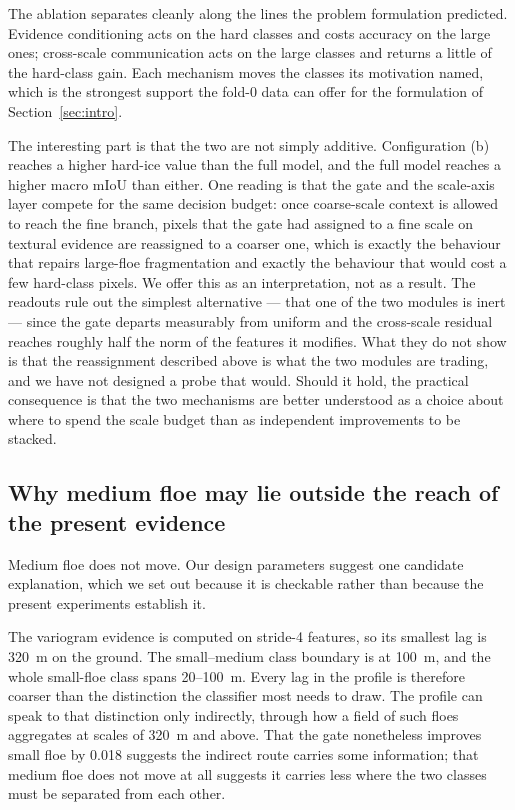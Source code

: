 \documentclass[preprint,12pt,authoryear]{elsarticle}
\begin{document}
The ablation separates cleanly along the lines the problem formulation
predicted. Evidence conditioning acts on the hard classes and costs accuracy on
the large ones; cross-scale communication acts on the large classes and returns
a little of the hard-class gain. Each mechanism moves the classes its motivation
named, which is the strongest support the fold-0 data can offer for the
formulation of Section~\ref{sec:intro}.

The interesting part is that the two are not simply additive. Configuration (b)
reaches a higher hard-ice value than the full model, and the full model reaches
a higher macro mIoU than either. One reading is that the gate and the scale-axis
layer compete for the same decision budget: once coarse-scale context is allowed
to reach the fine branch, pixels that the gate had assigned to a fine scale on
textural evidence are reassigned to a coarser one, which is exactly the
behaviour that repairs large-floe fragmentation and exactly the behaviour that
would cost a few hard-class pixels. We offer this as an interpretation, not as a
result. The readouts rule out the simplest alternative --- that one of the two
modules is inert --- since the gate departs measurably from uniform and the
cross-scale residual reaches roughly half the norm of the features it modifies.
What they do not show is that the reassignment described above is what the two
modules are trading, and we have not designed a probe that would. Should it hold, the practical
consequence is that the two mechanisms are better understood as a choice about
where to spend the scale budget than as independent improvements to be stacked.

\subsection{Why medium floe may lie outside the reach of the present evidence}

Medium floe does not move. Our design parameters suggest one candidate
explanation, which we set out because it is checkable rather than because the
present experiments establish it.

The variogram evidence is computed on stride-4 features, so its smallest lag is
320~m on the ground. The small--medium class boundary is at 100~m, and the whole
small-floe class spans 20--100~m. Every lag in the profile is therefore coarser
than the distinction the classifier most needs to draw. The profile can speak to
that distinction only indirectly, through how a field of such floes aggregates
at scales of 320~m and above. That the gate nonetheless improves small floe by
0.018 suggests the indirect route carries some information; that medium floe
does not move at all suggests it carries less where the two classes must be
separated from each other.
\end{document}
